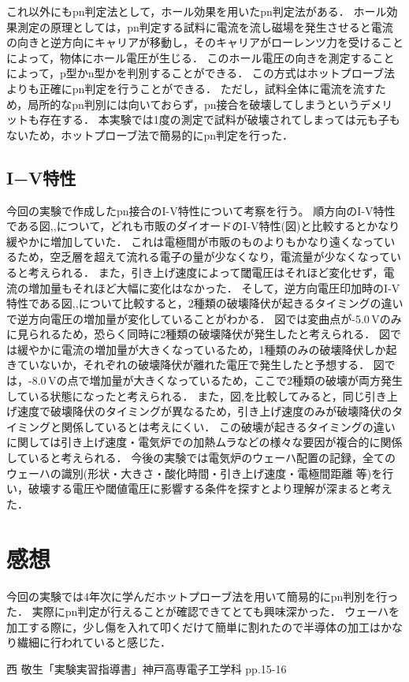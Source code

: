 \documentclass[11pt]{jarticle}
\begin{document}
		これ以外にもpn判定法として，ホール効果を用いたpn判定法がある．
		ホール効果測定の原理としては，pn判定する試料に電流を流し磁場を発生させると電流の向きと逆方向にキャリアが移動し，そのキャリアがローレンツ力を受けることによって，物体にホール電圧が生じる．
		このホール電圧の向きを測定することによって，p型かn型かを判別することができる．
		この方式はホットプローブ法よりも正確にpn判定を行うことができる．
		ただし，試料全体に電流を流すため，局所的なpn判別には向いておらず，pn接合を破壊してしまうというデメリットも存在する．
		本実験では1度の測定で試料が破壊されてしまっては元も子もないため，ホットプローブ法で簡易的にpn判定を行った．

	\subsection{I−V特性}
		今回の実験で作成したpn接合のI-V特性について考察を行う。
		順方向のI‐V特性である図,,について，どれも市販のダイオードのI‐V特性(図)と比較するとかなり緩やかに増加していた．
		これは電極間が市販のものよりもかなり遠くなっているため，空乏層を超えて流れる電子の量が少なくなり，電流量が少なくなっていると考えられる．
		また，引き上げ速度によって閾電圧はそれほど変化せず，電流の増加量もそれほど大幅に変化はなかった．
		そして，逆方向電圧印加時のI‐V特性である図,,について比較すると，2種類の破壊降伏が起きるタイミングの違いで逆方向電圧の増加量が変化していることがわかる．
		図では変曲点が-5.0\,Vのみに見られるため，恐らく同時に2種類の破壊降伏が発生したと考えられる．
		図では緩やかに電流の増加量が大きくなっているため，1種類のみの破壊降伏しか起きていないか，それぞれの破壊降伏が離れた電圧で発生したと予想する．
		図では，-8.0\,Vの点で増加量が大きくなっているため，ここで2種類の破壊が両方発生している状態になったと考えられる．
		また，図,を比較してみると，同じ引き上げ速度で破壊降伏のタイミングが異なるため，引き上げ速度のみが破壊降伏のタイミングと関係しているとは考えにくい．
		この破壊が起きるタイミングの違いに関しては引き上げ速度・電気炉での加熱ムラなどの様々な要因が複合的に関係していると考えられる．
		今後の実験では電気炉のウェーハ配置の記録，全てのウェーハの識別(形状・大きさ・酸化時間・引き上げ速度・電極間距離 等)を行い，破壊する電圧や閾値電圧に影響する条件を探すとより理解が深まると考えた．

\section{感想}
	今回の実験では4年次に学んだホットプローブ法を用いて簡易的にpn判別を行った．
	実際にpn判定が行えることが確認できてとても興味深かった．
	ウェーハを加工する際に，少し傷を入れて叩くだけて簡単に割れたので半導体の加工はかなり繊細に行われていると感じた．
	

\begin{thebibliography}{99}
	西 敬生「実験実習指導書」神戸高専電子工学科 pp.15-16
\end{thebibliography}
\end{document}
